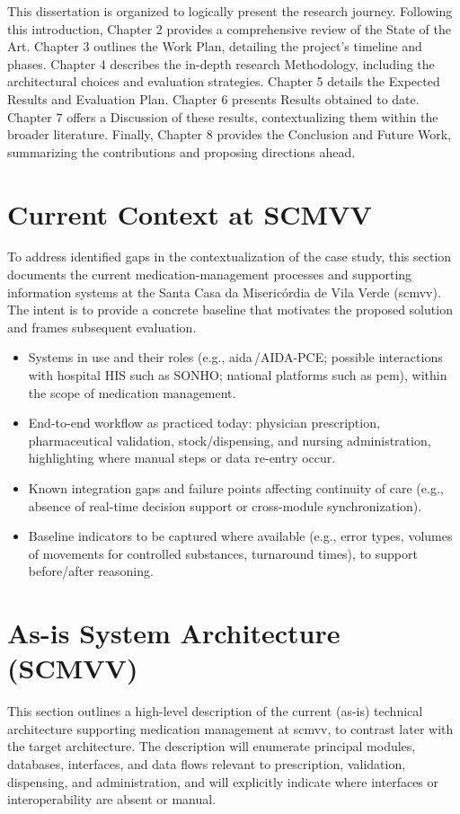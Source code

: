 This dissertation is organized to logically present the research journey. Following this introduction, Chapter 2 provides a comprehensive review of the State of the Art. Chapter 3 outlines the Work Plan, detailing the project's timeline and phases. Chapter 4 describes the in-depth research Methodology, including the architectural choices and evaluation strategies. Chapter 5 details the Expected Results and Evaluation Plan. Chapter 6 presents Results obtained to date. Chapter 7 offers a Discussion of these results, contextualizing them within the broader literature. Finally, Chapter 8 provides the Conclusion and Future Work, summarizing the contributions and proposing directions ahead. 

\section{Current Context at SCMVV}

To address identified gaps in the contextualization of the case study, this section documents the current medication-management processes and supporting information systems at the Santa Casa da Misericórdia de Vila Verde (\gls{scmvv}). The intent is to provide a concrete baseline that motivates the proposed solution and frames subsequent evaluation.

\begin{itemize}
    \item Systems in use and their roles (e.g., \gls{aida}\,/AIDA-PCE; possible interactions with hospital HIS such as SONHO; national platforms such as \gls{pem}), within the scope of medication management.
    \item End-to-end workflow as practiced today: physician prescription, pharmaceutical validation, stock/dispensing, and nursing administration, highlighting where manual steps or data re-entry occur.
    \item Known integration gaps and failure points affecting continuity of care (e.g., absence of real-time decision support or cross-module synchronization).
    \item Baseline indicators to be captured where available (e.g., error types, volumes of movements for controlled substances, turnaround times), to support before/after reasoning.
\end{itemize}

\section{As-is System Architecture (SCMVV)}

This section outlines a high-level description of the current (as-is) technical architecture supporting medication management at \gls{scmvv}, to contrast later with the target architecture. The description will enumerate principal modules, databases, interfaces, and data flows relevant to prescription, validation, dispensing, and administration, and will explicitly indicate where interfaces or interoperability are absent or manual.